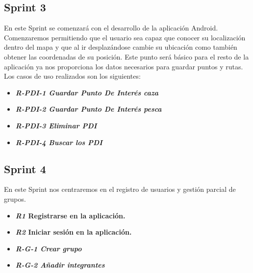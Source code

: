 \subsection{Sprint 3}

En este Sprint se comenzará con el desarrollo de la aplicación Android. Comenzaremos permitiendo que el usuario sea capaz que conocer su localización dentro del mapa y que al ir desplazándose cambie su ubicación como también obtener las coordenadas de su posición. Este punto será básico para el resto de la aplicación ya nos proporciona los datos necesarios para guardar puntos y rutas. Los casos de uso realizados son los siguientes:

\begin{itemize}

\item\textbf{\textit{ R-PDI-1 Guardar Punto De Interés caza}}
\item\textit{ \textbf{R-PDI-2 Guardar Punto De Interés pesca}}
\item \textbf{\textit{R-PDI-3 Eliminar PDI}}
\item \textbf{\textit{R-PDI-4 Buscar los PDI}}
\end{itemize} 



\subsection{Sprint 4}

En este Sprint nos centraremos en el registro de usuarios y gestión parcial de grupos.



\begin{itemize}
\item\textbf{ \textit{R1}  Registrarse en la aplicación.}
\item \textbf{\textit{R2} Iniciar sesión en la aplicación. }
\item\textbf{ \textit{R-G-1 Crear grupo}}
\item\textbf{\textit{ R-G-2 Añadir integrantes}}
\end{itemize} 


